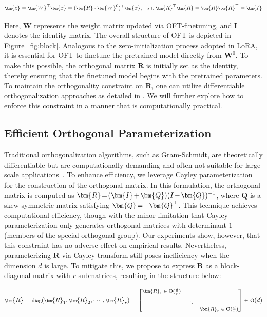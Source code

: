 \begin{equation}\label{eq:oft_general}
    \footnotesize
    \bm{z}=\bm{W}^\top\bm{x}=(\bm{R}\cdot\bm{W}^0)^\top\bm{x},~~~\text{s.t.}~\bm{R}^\top\bm{R}=\bm{R}\bm{R}^\top=\bm{I}
\end{equation}

Here, $\bm{W}$ represents the weight matrix updated via OFT-finetuning, and $\bm{I}$ denotes the identity matrix. The overall structure of OFT is depicted in Figure~\ref{fig:block}. Analogous to the zero-initialization process adopted in LoRA, it is essential for OFT to finetune the pretrained model directly from $\bm{W}^0$. To make this possible, the orthogonal matrix $\bm{R}$ is initially set as the identity, thereby ensuring that the finetuned model begins with the pretrained parameters. To maintain the orthogonality constraint on $\bm{R}$, one can utilize differentiable orthogonalization approaches as detailed in \cite{liu2021orthogonal,lezcano2019cheap}. We will further explore how to enforce this constraint in a manner that is computationally practical.

\subsection{Efficient Orthogonal Parameterization}\label{sect:eff_ortho}

Traditional orthogonalization algorithms, such as Gram-Schmidt, are theoretically differentiable but are computationally demanding and often not suitable for large-scale applications~\cite{liu2021orthogonal}. To enhance efficiency, we leverage Cayley parameterization for the construction of the orthogonal matrix. In this formulation, the orthogonal matrix is computed as $\thickmuskip=2mu \medmuskip=2mu \bm{R}=(\bm{I}+\bm{Q})(I-\bm{Q})^{-1}$, where $\bm{Q}$ is a skew-symmetric matrix satisfying $\thickmuskip=2mu \medmuskip=2mu \bm{Q}=-\bm{Q}^\top$. This technique achieves computational efficiency, though with the minor limitation that Cayley parameterization only generates orthogonal matrices with determinant $1$ (members of the special orthogonal group). Our experiments show, however, that this constraint has no adverse effect on empirical results. Nevertheless, parameterizing $\bm{R}$ via Cayley transform still poses inefficiency when the dimension $d$ is large. To mitigate this, we propose to express $\bm{R}$ as a block-diagonal matrix with $r$ submatrices, resulting in the structure below:

\begin{equation}
    \footnotesize
    \bm{R}=\text{diag}(\bm{R}_1,\bm{R}_2,\cdots,\bm{R}_r)=\begin{bmatrix}
    \bm{R}_1\in \text{O}(\frac{d}{r}) &  &\\
    &\ddots & \\
    & & \bm{R}_r\in \text{O}(\frac{d}{r})
    \end{bmatrix}\in \text{O}(d)
\end{equation}

